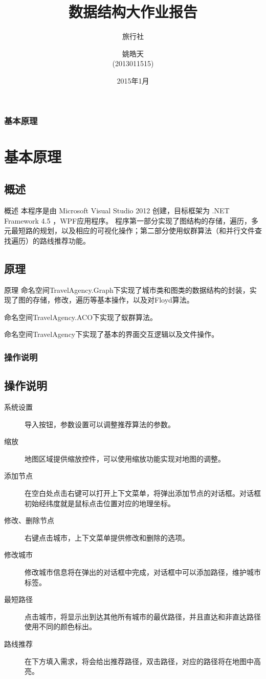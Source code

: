 \documentclass{beamer}
\begin{document}
\title{数据结构大作业报告}
\subtitle{旅行社}
\author{姚皓天\\(2013011515)}

\date{2015年1月}
\subject{数据结构}

\begin{frame} 
\titlepage 
\end{frame} 

\begin{frame}
\frametitle{基本原理}
\section{基本原理}
\subsection{概述}
\begin{block}{概述}
本程序是由 Microsoft Visual Studio 2012 创建，目标框架为 .NET Framework 4.5 ，WPF应用程序。
程序第一部分实现了图结构的存储，遍历，多元最短路的规划，以及相应的可视化操作；第二部分使用蚁群算法（和并行文件查找遍历）的路线推荐功能。
\end{block}

\subsection{原理}
\begin{block}{原理}
命名空间TravelAgency.Graph下实现了城市类和图类的数据结构的封装，实现了图的存储，修改，遍历等基本操作，以及对Floyd算法。\par
命名空间TravelAgency.ACO下实现了蚁群算法。\par
命名空间TravelAgency下实现了基本的界面交互逻辑以及文件操作。
\end{block}
\end{frame}


\begin{frame}
\frametitle{操作说明}
\subsection{操作说明}
\begin{description}
\item[系统设置]
导入按钮，参数设置可以调整推荐算法的参数。
\item[缩放]
地图区域提供缩放控件，可以使用缩放功能实现对地图的调整。
\item[添加节点]
在空白处点击右键可以打开上下文菜单，将弹出添加节点的对话框。对话框初始经纬度就是鼠标点击位置对应的地理坐标。
\item[修改、删除节点]
右键点击城市，上下文菜单提供修改和删除的选项。
\item[修改城市]
修改城市信息将在弹出的对话框中完成，对话框中可以添加路径，维护城市标签。
\item[最短路径]
点击城市，将显示出到达其他所有城市的最优路径，并且直达和非直达路径使用不同的颜色标出。
\item[路线推荐]
在下方填入需求，将会给出推荐路径，双击路径，对应的路径将在地图中高亮。
\end{description}
\end{frame}
\end{document}
